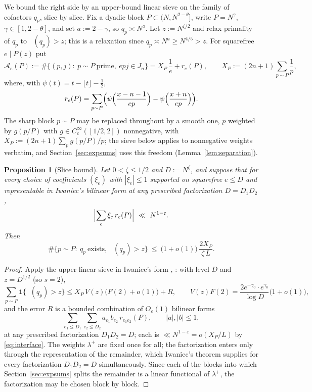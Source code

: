 \documentclass[11pt]{article}
\newtheorem{proposition}[theorem]{Proposition}
\theoremstyle{remark}
\DeclareMathOperator{\pmin}{P^{-}}
\newcommand{\N}{N}
\newcommand{\J}{J_n}
\newcommand{\A}{\mathcal{A}}
\begin{document}
We bound the right side by an upper-bound linear sieve on the family of cofactors
$q_p$, slice by slice. Fix a dyadic block $P\subset(\N,\N^{2-\theta}]$, write
$P=\N^{\gamma}$, $\gamma\in[1,2-\theta]$, and set $a:=2-\gamma$, so
$q_p\asymp \N^{a}$. Let $z:=\N^{\zeta/2}$ and relax primality of $q_p$ to
$\pmin(q_p)>z$; this is a relaxation since $q_p\asymp \N^{a}\ge \N^{4/5}>z$.
For squarefree $e\mid P(z)$ put
\[
\A_e(P):=\#\{(p,j):\ p\sim P\ \mathrm{prime},\ e p j\in\J\}
= X_P\,\frac1e + r_e(P),\qquad X_P:=(2n+1)\sum_{p\sim P}\frac1p ,
\]
where, with $\psi(t)=t-\lfloor t\rfloor-\tfrac12$,
\begin{equation}\label{eq:remainder-def}
r_e(P)=\sum_{p\sim P}\Bigl(\psi\Bigl(\frac{x-n-1}{ep}\Bigr)-\psi\Bigl(\frac{x+n}{ep}\Bigr)\Bigr).
\end{equation}
The sharp block $p\sim P$ may be replaced throughout by a smooth one, $p$ weighted by
$g(p/P)$ with $g\in C_c^{\infty}([1/2,2])$ nonnegative, with $X_P:=(2n+1)\sum_p g(p/P)/p$;
the sieve below applies to nonnegative weights verbatim, and
Section~\ref{sec:expsums} uses this freedom (Lemma~\ref{lem:separation}).

\begin{proposition}[Slice bound]\label{prop:slice}
Let $0<\zeta\le 1/2$ and $D:=\N^{\zeta}$, and suppose that for every choice of
coefficients $(\xi_e)$ with $|\xi_e|\le 1$ supported on squarefree $e\le D$ and
representable in Iwaniec's bilinear form at any prescribed factorization $D=D_1D_2$,
\begin{equation}\label{eq:interface}
\Bigl|\sum_{e}\xi_e\, r_e(P)\Bigr|\ \ll\ \N^{1-\varepsilon}.
\end{equation}
Then
\[
\#\{p\sim P:\ q_p\ \text{exists},\ \pmin(q_p)>z\}
\ \le\ \bigl(1+o(1)\bigr)\,\frac{2X_P}{\zeta\, L}.
\]
\end{proposition}

\begin{proof}
Apply the upper linear sieve in Iwaniec's form \cite{Iwaniec80},
\cite[Ch.~12]{FriedlanderIwaniec}: with level $D$ and $z=D^{1/2}$ (so $s=2$),
\[
\sum_{p\sim P}\mathbf{1}\{\pmin(q_p)>z\}
\le X_P\,V(z)\bigl(F(2)+o(1)\bigr)+R,
\qquad V(z)F(2)=\frac{2e^{-\gamma_0}\cdot e^{\gamma_0}}{\log D}\bigl(1+o(1)\bigr),
\]
and the error $R$ is a bounded combination of
$O_\varepsilon(1)$ bilinear forms
\[
\sum_{e_1\le D_1}\sum_{e_2\le D_2} a_{e_1}b_{e_2}\,r_{e_1e_2}(P),
\qquad |a|,|b|\le 1,
\]
at any prescribed factorization $D_1D_2=D$; each is
$\ll \N^{1-\varepsilon}=o(X_P/L)$ by \eqref{eq:interface}. The weights $\lambda^{+}$
are fixed once for all; the factorization enters only through the representation of
the remainder, which Iwaniec's theorem supplies for every factorization $D_1D_2=D$
simultaneously. Since each of the blocks into which Section~\ref{sec:expsums} splits
the remainder is a linear functional of $\lambda^{+}$, the factorization may be chosen
block by block.
\end{proof}
\end{document}

